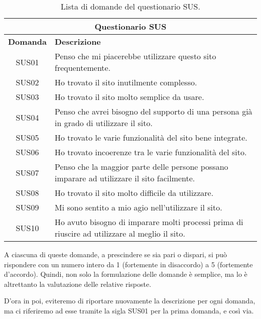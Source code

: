 \begin{center}
    \begin{table}[H]
        \centering
        \begin{tabularx}{1.02\textwidth}{|c|X|}
            \hline
            \multicolumn{2}{|c|}{\textbf{Questionario SUS}} \\
            \hline
            \textbf{Domanda} & \textbf{Descrizione}\\
            \hline
            SUS01 & Penso che mi piacerebbe utilizzare questo sito frequentemente.\\
            SUS02 & Ho trovato il sito inutilmente complesso.\\
            SUS03 & Ho trovato il sito molto semplice da usare.\\
            SUS04 & Penso che avrei bisogno del supporto di una persona già in grado di utilizzare il sito.\\
            SUS05 & Ho trovato le varie funzionalità del sito bene integrate.\\
            SUS06 & Ho trovato incoerenze tra le varie funzionalità del sito.\\
            SUS07 & Penso che la maggior parte delle persone possano imparare ad utilizzare il sito facilmente.\\
            SUS08 & Ho trovato il sito molto difficile da utilizzare.\\
            SUS09 & Mi sono sentito a mio agio nell'utilizzare il sito.\\
            SUS10 & Ho avuto bisogno di imparare molti processi prima di riuscire ad utilizzare al meglio il sito.\\
            \hline
        \end{tabularx}
        \caption[Lista di domande del questionario SUS]{Lista di domande del questionario SUS.}
        \label{tab:sus_questions}
    \end{table}
\end{center}

A ciascuna di queste domande, a prescindere se sia pari o dispari, si può rispondere con un numero intero da 1 (fortemente in disaccordo) a 5 (fortemente d'accordo). Quindi, non solo la formulazione delle domande è semplice, ma lo è altrettanto la valutazione delle relative risposte.

D'ora in poi, eviteremo di riportare nuovamente la descrizione per ogni domanda, ma ci riferiremo ad esse tramite la sigla SUS01 per la prima domanda, e così via.

